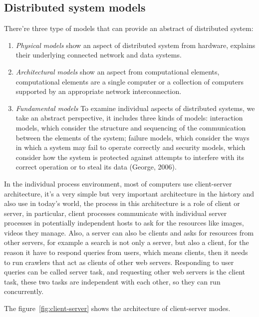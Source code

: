 \documentclass[11pt]{book}
\begin{document}
\subsection{Distributed system models}
There're three type of models that can provide an abstract of distributed system:
\begin{enumerate}
	\item \textit{Physical models} show an aspect of distributed system from hardware, 
	explains their underlying connected network and data systems.
	\item \textit{Architectural models} show an aspect from computational elements, 
	computational elements are a single computer or a collection of computers supported by an appropriate network interconnection.
	\item \textit{Fundamental models} To examine individual aspects of distributed systems, we take an abstract perspective, it includes
	three kinds of models: interaction models, which consider the structure and sequencing of the communication between the elements of the system; 
	failure models, which consider the ways in which a system may fail to operate correctly and security models, which consider how the system is protected against attempts to interfere with its correct operation or to steal its data (George, 2006).

\end{enumerate}
In the individual process environment, most of computers use client-server architecture, it's a very simple 
but very important architecture in the history and also use in today's world, 
the process in this architecture is a role of client or server, in particular, 
client processes communicate with individual server processes in potentially independent hosts to 
ask for the  resources like images, videos they manage.
Also, a server can also be clients and asks for resources from other servers, for example a search is not only 
a server, but also a client, for the reason it have to respond queries from users,
which means clients,  then it needs to run crawlers that act as clients of other web servers.
Responding to user queries can be called server task, and requesting other web servers is the client task,
these two tasks are independent with each other, so they can run concurrently.

The figure~\ref{fig:client-server} shows the architecture of client-server modes.
\end{document}
